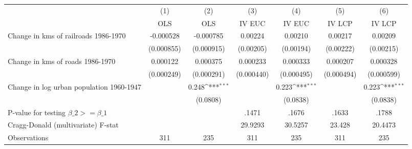 {
\def\sym#1{\ifmmode^{#1}\else\(^{#1}\)\fi}
\begin{tabular}{l*{6}{c}}
\hline\hline
                &\multicolumn{1}{c}{(1)}&\multicolumn{1}{c}{(2)}&\multicolumn{1}{c}{(3)}&\multicolumn{1}{c}{(4)}&\multicolumn{1}{c}{(5)}&\multicolumn{1}{c}{(6)}\\
                &\multicolumn{1}{c}{OLS}&\multicolumn{1}{c}{OLS}&\multicolumn{1}{c}{IV EUC}&\multicolumn{1}{c}{IV EUC}&\multicolumn{1}{c}{IV LCP}&\multicolumn{1}{c}{IV LCP}\\
\hline
Change in kms of railroads 1986-1970&-0.000528         &-0.000785         &  0.00224         &  0.00210         &  0.00217         &  0.00209         \\
                &(0.000855)         &(0.000915)         &(0.00205)         &(0.00194)         &(0.00222)         &(0.00215)         \\
[1em]
Change in kms of roads 1986-1970& 0.000122         & 0.000375         & 0.000233         & 0.000333         & 0.000207         & 0.000328         \\
                &(0.000249)         &(0.000291)         &(0.000440)         &(0.000495)         &(0.000494)         &(0.000599)         \\
[1em]
Change in log urban population 1960-1947&                  &    0.248\sym{***}&                  &    0.223\sym{***}&                  &    0.223\sym{***}\\
                &                  & (0.0808)         &                  & (0.0838)         &                  & (0.0838)         \\
\hline
P-value for testing $\beta\_{2} >= \beta\_{1}$&                  &                  &    .1471         &    .1676         &    .1633         &    .1788         \\
Cragg-Donald (multivariate) F-stat&                  &                  &  29.9293         &  30.5257         &   23.428         &  20.4473         \\
Observations    &      311         &      235         &      311         &      235         &      311         &      235         \\
\hline\hline
\end{tabular}
}
